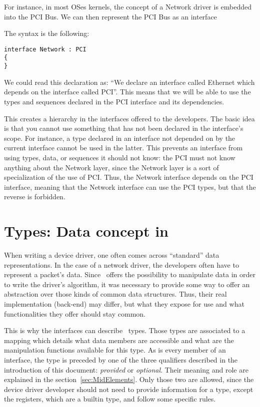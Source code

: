 \documentclass[american]{rtxreport}
\begin{document}
For instance, in most OSes kernels, the concept of a Network driver is embedded
into the PCI Bus. We can then represent the PCI Bus as an interface

The syntax is the following:
\begin{lstlisting}
interface Network : PCI
{
}
\end{lstlisting}

We could read this declaration as: ``We declare an interface called Ethernet
which depends on the interface called PCI''. This means that we will be able to
use the types and sequences declared in the PCI interface and its dependencies.

This creates a hierarchy in the interfaces offered to the developers. The basic
idea is that you cannot use something that has not been declared in the
interface's scope. For instance, a type declared in an interface not depended
on by the current interface cannot be used in the latter. This prevents an
interface from using types, data, or sequences it should not know: the PCI
must not know anything about the Network layer, since the Network layer is
a sort of specialization of the use of PCI. Thus, the Network interface
depends on the PCI interface, meaning that the Network interface can use the
PCI types, but that the reverse is forbidden.


\section{Types: Data concept in \rtx}

When writing a device driver, one often comes across ``standard'' data
representations. In the case of a network driver, the developers often have
to represent a packet's data. Since \rtx\ offers the possibility to manipulate
data in order to write the driver's algorithm, it was necessary to provide
some way to offer an abstraction over those kinds of common data structures.
Thus, their real implementation (back-end) may differ, but what they expose
for use and what functionalities they offer should stay common.

This is why the interfaces can describe \rtx\ types. Those types are associated
to a mapping which details what data members are accessible and what are the
manipulation functions available for this type. As is every member of an
interface, the type is preceded by one of the three qualifiers described in the
introduction of this document: \emph{provided} or \emph{optional}.
Their meaning and role are explained in the section~\ref{sec:MidElements}.
Only those two are allowed, since the device driver developer should not need
to provide information for a type, except the registers, which are a builtin
type, and follow some specific rules.
\end{document}

